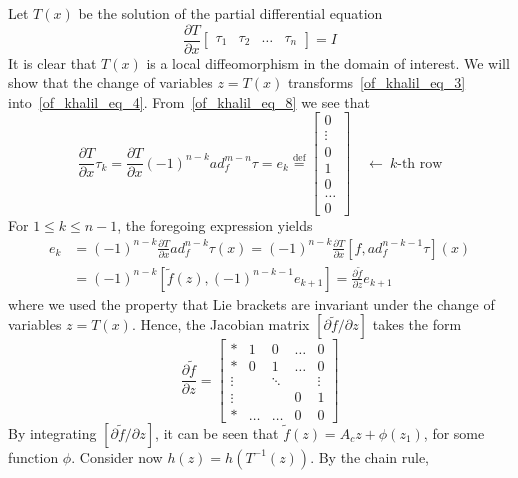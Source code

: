\documentclass[12pt,a4paper,oneside]{book}
\begin{document}
\begin{onehalfspace}
Let $T(x)$ be the solution of the partial differential equation 
\begin{equation}\label{of_khalil_eq_8}
	\frac{\partial T}{\partial x}\begin{bmatrix} \tau_1&\tau_2&\dots&\tau_n\end{bmatrix}=I
\end{equation}
It is clear that $T(x)$ is a local diffeomorphism in the domain of interest. We will show that the change of variables $z=T(x)$ transforms~\eqref{of_khalil_eq_3} into~\eqref{of_khalil_eq_4}. From~\eqref{of_khalil_eq_8} we see that
\begin{equation*}
	\frac{\partial T}{\partial x}\tau_k=\frac{\partial T}{\partial x}(-1)^{n-k}ad_f^{m-n}\tau=e_k\stackrel{\text{def}}{=}
	\begin{bmatrix} 0 \\[6pt] \vdots \\[6pt] 0 \\[6pt] 1 \\[6pt] 0 \\[6pt] \dots \\[6pt] 0 \end{bmatrix}\quad\leftarrow\ k\text{-th row}
\end{equation*}
For $1\le k \le n-1$, the foregoing expression yields
\begin{equation*}
	\begin{aligned}
		e_k &= (-1)^{n-k}\frac{\partial T}{\partial x}ad_f^{n-k}\tau(x) = (-1)^{n-k}\frac{\partial T}{\partial x}[f,ad_f^{n-k-1}\tau](x) \\[6pt]
		&= (-1)^{n-k}[\tilde{f}(z),(-1)^{n-k-1}e_{k+1}]=\frac{\partial \tilde{f}}{\partial z}e_{k+1}
	\end{aligned}
\end{equation*}
where we used the property that Lie brackets are invariant under the change of variables $z=T(x)$. Hence, the Jacobian matrix $[\partial \tilde{f}/\partial z]$ takes the form
\begin{equation*}
	\frac{\partial \tilde{f}}{\partial z}=\begin{bmatrix} * & 1 & 0 & \dots & 0 \\[6pt] * & 0 & 1 & \dots & 0 \\[6pt] \vdots &  & \ddots &  & \vdots \\[6pt] \vdots & & & 0 & 1 \\[6pt] * & \dots & \dots & 0 & 0 \end{bmatrix}
\end{equation*}
By integrating $[\partial \tilde{f}/\partial z]$, it can be seen that $\tilde{f}(z)=A_cz+\phi(z_1)$, for some function $\phi$. Consider now $h(z)=h(T^{-1}(z))$. By the chain rule,

\end{onehalfspace}
\end{document}
